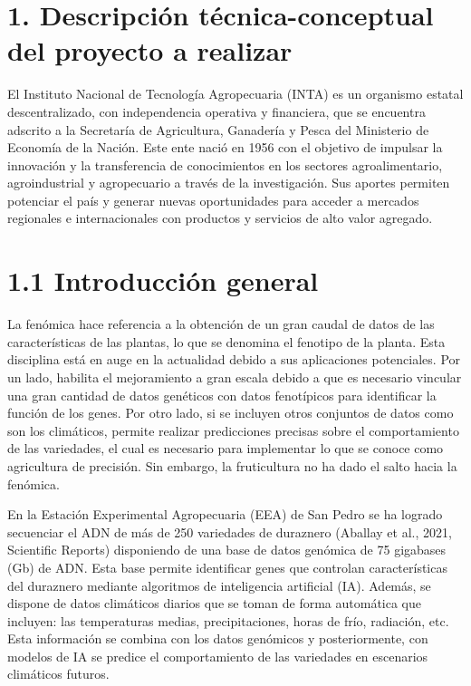 \documentclass[
11pt, %
codirector, %
]{charter}
\begin{document}
\pagebreak

\section{1. Descripción técnica-conceptual del proyecto a realizar}
\label{sec:descripcion}

El Instituto Nacional de Tecnología Agropecuaria (INTA) es un organismo estatal descentralizado, con independencia operativa y financiera, que se encuentra adscrito a la Secretaría de Agricultura, Ganadería y Pesca del Ministerio de Economía de la Nación. Este ente nació en 1956 con el objetivo de impulsar la innovación y la transferencia de conocimientos en los sectores agroalimentario, agroindustrial y agropecuario a través de la investigación. Sus aportes permiten potenciar el país y generar nuevas oportunidades para acceder a mercados regionales e internacionales con productos y servicios de alto valor agregado.

\section{1.1 Introducción general}
\label{sec:descripcion}

La fenómica hace referencia a la obtención de un gran caudal de datos de las características de las plantas, lo que se denomina el fenotipo de la planta. Esta disciplina está en auge en la actualidad debido a sus aplicaciones potenciales. Por un lado, habilita el mejoramiento a gran escala debido a que es necesario vincular una gran cantidad de datos genéticos con datos fenotípicos para identificar la función de los genes. Por otro lado, si se incluyen otros conjuntos de datos como son los climáticos, permite realizar predicciones precisas sobre el comportamiento de las variedades, el cual es necesario para implementar lo que se conoce como agricultura de precisión. Sin embargo, la fruticultura no ha dado el salto hacia la fenómica.

En la  Estación Experimental Agropecuaria (EEA) de San Pedro se ha logrado secuenciar el ADN de más de 250 variedades de duraznero (Aballay et al., 2021, Scientific Reports) disponiendo de una base de datos genómica de 75 gigabases (Gb) de ADN. Esta base permite identificar genes que controlan características del duraznero mediante algoritmos de inteligencia artificial (IA). Además, se dispone de datos climáticos diarios que se toman de forma automática que incluyen: las temperaturas medias, precipitaciones, horas de frío, radiación, etc. Esta información se combina con los datos genómicos y posteriormente, con modelos de IA se predice el comportamiento de las variedades en escenarios climáticos futuros.
\end{document}

